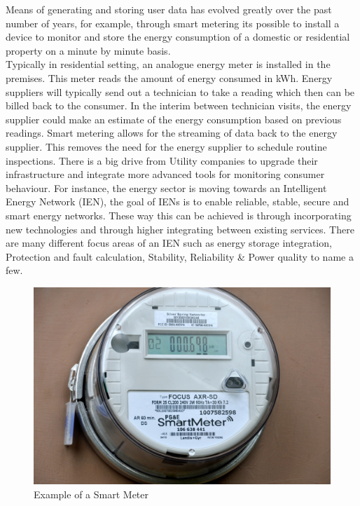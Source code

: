 Means of generating and storing user data has evolved greatly over the past number of years, for example, through smart metering its possible to install a device to monitor and store the energy consumption of a domestic or residential property on a minute by minute basis. \\
Typically in residential setting, an analogue energy meter is installed in the premises. This meter reads the amount of energy consumed in kWh. Energy suppliers will typically send out  a technician to take a reading which then can be billed back to the consumer. In the interim between technician visits, the energy supplier could make an estimate of the energy consumption based on previous readings. Smart metering allows for the streaming of data back to the energy supplier. This removes the need for the energy supplier to schedule routine inspections. There is a big drive from Utility companies to upgrade their infrastructure and integrate more advanced tools for monitoring consumer behaviour.
For instance, the energy sector is moving towards an Intelligent Energy Network (IEN), the goal of IENs is to enable reliable, stable, secure and smart energy networks. These way this can be achieved is through incorporating new technologies and through higher integrating between existing services. There are many different focus areas of an IEN such as energy storage integration, Protection and fault calculation, Stability, Reliability \& Power quality to name a few.



        \begin{figure}[H]
        \centering     
        \includegraphics[width=1\textwidth]{Figures/smart-meter-emf-safety-network.jpg}
        \caption{Example of a Smart Meter}
        \label{fig:Daily Consumption}
        \end{figure}